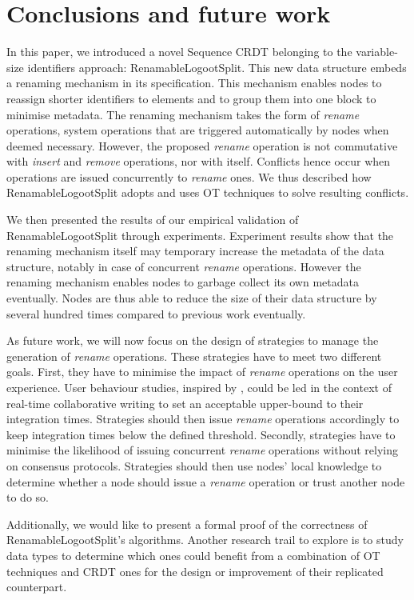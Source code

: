 \documentclass[10pt,journal,compsoc]{IEEEtran}
\begin{document}
\section{Conclusions and future work}

In this paper, we introduced a novel Sequence \ac{CRDT} belonging to the variable-size identifiers approach: RenamableLogootSplit.
This new data structure embeds a renaming mechanism in its specification.
This mechanism enables nodes to reassign shorter identifiers to elements and to group them into one block to minimise metadata.
The renaming mechanism takes the form of \emph{rename} operations, system operations that are triggered automatically by nodes when deemed necessary.
However, the proposed \emph{rename} operation is not commutative with \emph{insert} and \emph{remove} operations, nor with itself.
Conflicts hence occur when operations are issued concurrently to \emph{rename} ones.
We thus described how RenamableLogootSplit adopts and uses \ac{OT} techniques to solve resulting conflicts.

We then presented the results of our empirical validation of RenamableLogootSplit through experiments.
Experiment results show that the renaming mechanism itself may temporary increase the metadata of the data structure, notably in case of concurrent \emph{rename} operations.
However the renaming mechanism enables nodes to garbage collect its own metadata eventually.
Nodes are thus able to reduce the size of their data structure by several hundred times compared to previous work eventually.

As future work, we will now focus on the design of strategies to manage the generation of \emph{rename} operations.
These strategies have to meet two different goals.
First, they have to minimise the impact of \emph{rename} operations on the user experience.
User behaviour studies, inspired by \cite{ignat:hal-01088815,ignat:hal-01238831}, could be led in the context of real-time collaborative writing to set an acceptable upper-bound to their integration times.
Strategies should then issue \emph{rename} operations accordingly to keep integration times below the defined threshold.
Secondly, strategies have to minimise the likelihood of issuing concurrent \emph{rename} operations without relying on consensus protocols.
Strategies should then use nodes' local knowledge to determine whether a node should issue a \emph{rename} operation or trust another node to do so.

Additionally, we would like to present a formal proof of the correctness of RenamableLogootSplit's algorithms.
Another research trail to explore is to study data types to determine which ones could benefit from a combination of \ac{OT} techniques and \ac{CRDT} ones for the design or improvement of their replicated counterpart.
\end{document}
